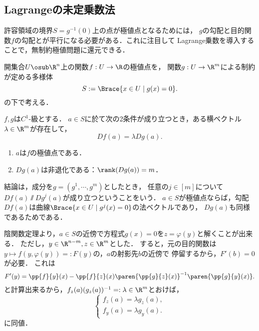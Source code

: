 \documentclass[uplatex,dvipdfmx]{jsarticle}
\begin{document}
\subsection{Lagrangeの未定乗数法}

\begin{tcolorbox}[colframe=ForestGreen, colback=ForestGreen!10!white,breakable,colbacktitle=ForestGreen!40!white,coltitle=black,fonttitle=\bfseries\sffamily,
    title=]
    許容領域の境界$S=g^{-1}(0)$上の点が極値点となるためには，
    $g$の勾配と目的関数$f$の勾配とが平行になる必要がある．これに注目して
    Lagrange乗数を導入することで，無制約極値問題に還元できる．
\end{tcolorbox}

\begin{problem}
    開集合$U\osub\R^n$上の関数$f:U\to\R$の極値点を，
    関数$g:U\to\R^m$による制約が定める多様体
    \[S:=\Brace{x\in U\mid g(x)=0}.\]
    の下で考える．
\end{problem}

\begin{theorem}
    $f,g$は$C^1$-級とする．
    $a\in S$に於て次の2条件が成り立つとき，ある横ベクトル$\lambda\in\R^m$が存在して，
    \[Df(a)=\lambda Dg(a).\]
    \begin{enumerate}
        \item $a$は$f$の極値点である．
        \item $Dg(a)$は非退化である：$\rank(Dg(a))=m$．
    \end{enumerate}
\end{theorem}
\begin{remarks}[勾配ベクトルの消息]
    結論は，成分を$g=(g^1,\cdots,g^m)$としたとき，
    任意の$j\in[m]$について$Df(a)\varparallel Dg^j(a)$が成り立つということをいう．
    $a\in S$が極値点ならば，勾配$Df(a)$は曲線$\Brace{x\in U\mid g^j(x)=0}$の法ベクトルであり，
    $Dg(a)$も同様であるためである．
\end{remarks}
\begin{Proof}
    陰関数定理より，$a\in S$の近傍で方程式$g(x)=0$を$z=\varphi(y)$と解くことが出来る．
    ただし，$y\in\R^{n-m},z\in\R^m$とした．
    すると，元の目的関数は$y\mapsto f(y,\varphi(y))=:F(y)$の，$a$の射影先$b$の近傍で
    停留するから，$F'(b)=0$が必要．
    これは
    \[F'(y)=\pp{f}{y}(x)-\pp{f}{z}(x)\paren{\pp{g}{z}(x)}^{-1}\paren{\pp{g}{y}(x)}.\]
    と計算出来るから，$f_z(a)(g_z(a))^{-1}=:\lambda\in\R^m$とおけば，
    \[\begin{cases}
        f_z(a)=\lambda g_z(a),\\
        f_y(a)=\lambda g_y(a).
    \end{cases}\]
    に同値．
\end{Proof}
\end{document}
